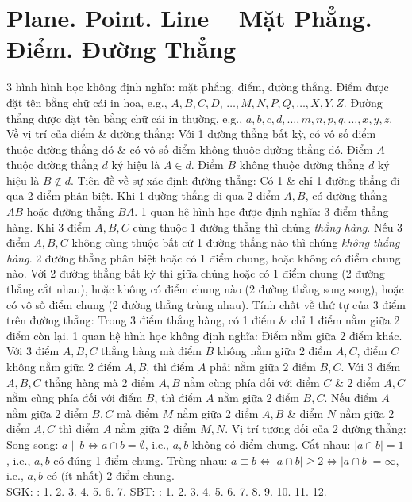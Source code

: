 \documentclass{article}
\begin{document}
\section{Plane. Point. Line -- Mặt Phẳng. Điểm. Đường Thẳng}
 3 hình hình học không định nghĩa: mặt phẳng, điểm, đường thẳng. Điểm được đặt tên bằng chữ cái in hoa, e.g., $A,B,C,D$, $\ldots,M,N,P,Q,\ldots,X,Y,Z$. Đường thẳng được đặt tên bằng chữ cái in thường, e.g., $a,b,c,d,\ldots,m,n,p,q,\ldots,x,y,z$.  {\sf Về vị trí của điểm \& đường thẳng}: Với 1 đường thẳng bất kỳ, có vô số điểm thuộc đường thẳng đó \& có vô số điểm không thuộc đường thẳng đó. Điểm $A$ thuộc đường thẳng $d$ ký hiệu là $A\in d$. Điểm $B$ không thuộc đường thẳng $d$ ký hiệu là $B\notin d$.  {\sf Tiên đề về sự xác định đường thẳng}: Có 1 \& chỉ 1 đường thẳng đi qua 2 điểm phân biệt. Khi 1 đường thẳng đi qua 2 điểm $A,B$, có đường thẳng $AB$ hoặc đường thẳng $BA$. 1 quan hệ hình học được định nghĩa: 3 điểm thẳng hàng. Khi 3 điểm $A,B,C$ cùng thuộc 1 đường thẳng thì chúng \textit{thẳng hàng}. Nếu 3 điểm $A,B,C$ không cùng thuộc bất cứ 1 đường thẳng nào thì chúng \textit{không thẳng hàng}.  2 đường thẳng phân biệt hoặc có 1 điểm chung, hoặc không có điểm chung nào.  Với 2 đường thẳng bất kỳ thì giữa chúng hoặc có 1 điểm chung (2 đường thẳng cắt nhau), hoặc không có điểm chung nào (2 đường thẳng song song), hoặc có vô số điểm chung (2 đường thẳng trùng nhau).  {\sf Tính chất về thứ tự của 3 điểm trên đường thẳng}: Trong 3 điểm thẳng hàng, có 1 điểm \& chỉ 1 điểm nằm giữa 2 điểm còn lại. 1 quan hệ hình học không định nghĩa: Điểm nằm giữa 2 điểm khác.  Với 3 điểm $A,B,C$ thẳng hàng mà điểm $B$ không nằm giữa 2 điểm $A,C$, điểm $C$ không nằm giữa 2 điểm $A,B$, thì điểm $A$ phải nằm giữa 2 điểm $B,C$.  Với 3 điểm $A,B,C$ thẳng hàng mà 2 điểm $A,B$ nằm cùng phía đối với điểm $C$ \& 2 điểm $A,C$ nằm cùng phía đối với điểm $B$, thì điểm $A$ nằm giữa 2 điểm $B,C$.  Nếu điểm $A$ nằm giữa 2 điểm $B,C$ mà điểm $M$ nằm giữa 2 điểm $A,B$ \& điểm $N$ nằm giữa 2 điểm $A,C$ thì điểm $A$ nằm giữa 2 điểm $M,N$.  {\sf Vị trí tương đối của 2 đường thẳng}: Song song: $a\parallel b\Leftrightarrow a\cap b = \emptyset$, i.e., $a,b$ không có điểm chung. Cắt nhau: $|a\cap b| = 1$, i.e., $a,b$ có đúng 1 điểm chung. Trùng nhau: $a\equiv b\Leftrightarrow|a\cap b|\ge 2\Leftrightarrow|a\cap b| = \infty$, i.e., $a,b$ có (ít nhất) 2 điểm chung.\\

\noindent SGK: \cite[\S1, p. 79]{SGK_Toan_6_Canh_Dieu_tap_1}: 1. 2. 3. 4. 5. 6. 7. SBT: \cite{SBT_Toan_6_Canh_Dieu_tap_2}: 1. 2. 3. 4. 5. 6. 7. 8. 9. 10. 11. 12.
\end{document}
